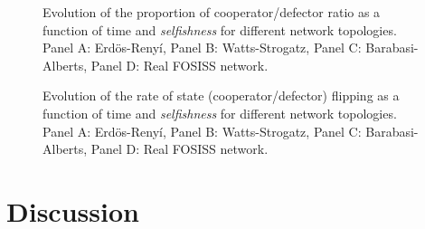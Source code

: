 \FloatBarrier

\begin{figure}
\caption{Evolution of the proportion of cooperator/defector ratio as a function of time and \emph{selfishness} for different network topologies. Panel A: Erd\"os-Reny\'i, Panel B: Watts-Strogatz, Panel C: Barabasi-Alberts, Panel D: Real FOSISS network.}
\label{fig:3}       %
\end{figure}

\FloatBarrier

\begin{figure}
\caption{Evolution of the rate of state (cooperator/defector) flipping as a function of time and \emph{selfishness} for different network topologies. Panel A: Erd\"os-Reny\'i, Panel B: Watts-Strogatz, Panel C: Barabasi-Alberts, Panel D: Real FOSISS network.}
\label{fig:4}       %
\end{figure}

\FloatBarrier



\section{Discussion}
\label{sec:4}





